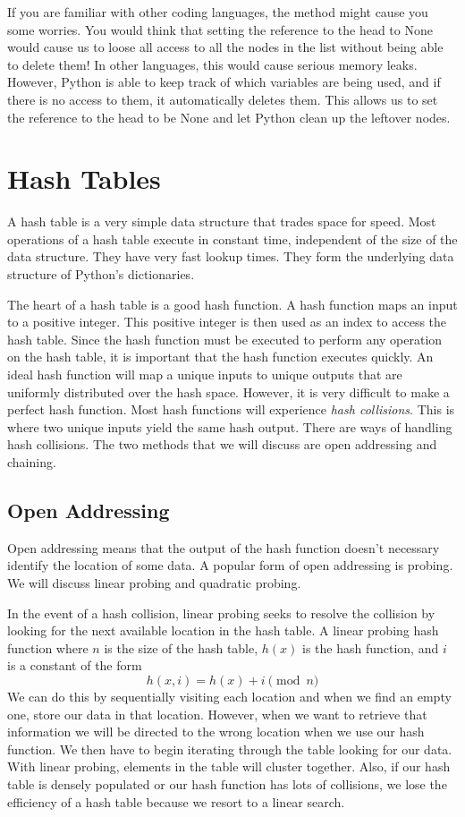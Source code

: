 If you are familiar with other coding languages, the  method might cause you some worries.
You would think that setting the reference to the head to None would cause us to loose all access to all the nodes in the list without being able to delete them!
In other languages, this would cause serious memory leaks.
However, Python is able to keep track of which variables are being used, and if there is no access to them, it automatically deletes them.
This allows us to set the reference to the head to be None and let Python clean up the leftover nodes.

\section*{Hash Tables}
A hash table is a very simple data structure that trades space for speed.
Most operations of a hash table execute in constant time, independent of the size of the data structure.  
They have very fast lookup times.  They form the underlying data structure of Python's dictionaries.

The heart of a hash table is a good hash function.  
A hash function maps an input to a positive integer. 
This positive integer is then used as an index to access the hash table. 
Since the hash function must be executed to perform any operation on the hash table, it is important that the hash function executes quickly.
An ideal hash function will map a unique inputs to unique outputs that are uniformly distributed over the hash space. 
However, it is very difficult to make a perfect hash function.  Most hash functions will experience \emph{hash collisions}. 
This is where two unique inputs yield the same hash output.
There are ways of handling hash collisions.  The two methods that we will discuss are open addressing and chaining.

\subsection*{Open Addressing}
Open addressing means that the output of the hash function doesn't necessary identify the location of some data.
A popular form of open addressing is probing. 
We will discuss linear probing and quadratic probing.

In the event of a hash collision, linear probing seeks to resolve the collision by looking for the next available location in the hash table.
A linear probing hash function where $n$ is the size of the hash table, $h(x)$ is the hash function, and $i$ is a constant of the form
\begin{equation*}
h(x, i) = h(x) + i \pmod{n}
\end{equation*}
We can do this by sequentially visiting each location and when we find an empty one, store our data in that location.  
However, when we want to retrieve that information we will be directed to the wrong location when we use our hash function. 
We then have to begin iterating through the table looking for our data.
With linear probing, elements in the table will cluster together.
Also, if our hash table is densely populated or our hash function has lots of collisions, 
 we lose the efficiency of a hash table because we resort to a linear search.

